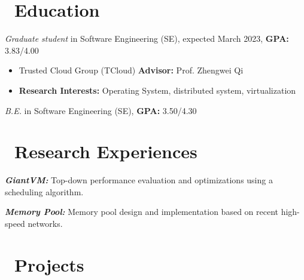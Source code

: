 \documentclass{resume}
\begin{document}



\section{\faGraduationCap\ Education}
\textit{Graduate student} in Software Engineering (SE), expected March 2023, \textbf{GPA:} 3.83/4.00
\begin{itemize}
  \item Trusted Cloud Group (TCloud) \textbf{Advisor:} Prof. Zhengwei Qi
  \item \textbf{Research Interests:} Operating System, distributed system, virtualization
\end{itemize}
\textit{B.E.} in Software Engineering (SE), \textbf{GPA:} 3.50/4.30

\section{\faUsers\ Research Experiences}
\textbf{\textit{GiantVM:}} Top-down performance evaluation and optimizations using a scheduling algorithm.

\textbf{\textit{Memory Pool:}} Memory pool design and implementation based on recent high-speed networks.


\section{\faInfo\ Projects}
\end{document}
